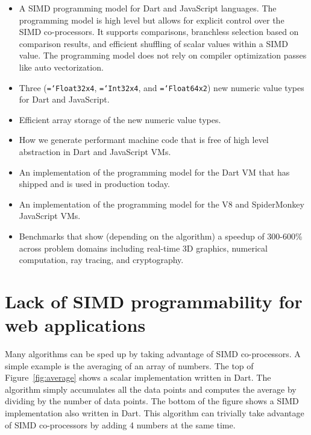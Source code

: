 \documentclass{sigplanconf}
\newcommand{\ttt}[1]{{\texttt{\hyphenchar\font=`\-\relax #1}}}%
\begin{document}
\begin{itemize}
\item
A SIMD programming model for Dart and JavaScript languages. The programming
model is high level but allows for explicit control over the SIMD co-processors.
It supports comparisons, branchless selection based on comparison results, and
efficient shuffling of scalar values within a SIMD value. The programming model
does not rely on compiler optimization passes like auto vectorization.

\item
Three (\ttt{Float32x4}, \ttt{Int32x4}, and \ttt{Float64x2}) new numeric value
types for Dart and JavaScript.

\item
Efficient array storage of the new numeric value types.

\item
How we generate performant machine code that is free of high level abstraction
in Dart and JavaScript VMs.

\item
An implementation of the programming model for the Dart VM that has shipped and
is used in production today.

\item
An implementation of the programming model for the V8 and SpiderMonkey
JavaScript VMs.

\item
Benchmarks that show (depending on the algorithm) a speedup of 300-600\% across
problem domains including real-time 3D graphics, numerical computation, ray
tracing, and cryptography.
\end{itemize}

\section{Lack of SIMD programmability for web applications}

Many algorithms can be sped up by taking advantage of SIMD co-processors. A
simple example is the averaging of an array of numbers. The top of
Figure~\ref{fig:average} shows a scalar implementation written in Dart. The
algorithm simply accumulates all the data points and computes the average by
dividing by the number of data points. The bottom of the figure shows a SIMD
implementation also written in Dart. This algorithm can trivially take advantage
of SIMD co-processors by adding 4 numbers at the same time.
\end{document}
